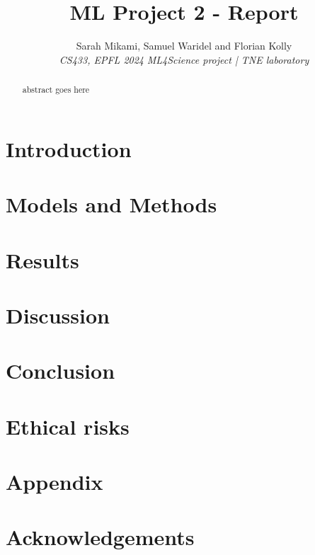 \documentclass[10pt,conference,compsocconf]{IEEEtran}
\begin{document}
\title{ML Project 2 - Report}

\author{
  Sarah Mikami, Samuel Waridel and Florian Kolly \\
  \textit{CS433, EPFL 2024}
  \textit{ML4Science project | TNE laboratory}
}

\maketitle

\begin{abstract}
  abstract goes here
\end{abstract}

\section{Introduction}

\cite{Glaser.etal2020a}


\section{Models and Methods}




\section{Results}



\section{Discussion}


\section{Conclusion}


\section{Ethical risks}




\section{Appendix}



\section*{Acknowledgements}



\end{document}
